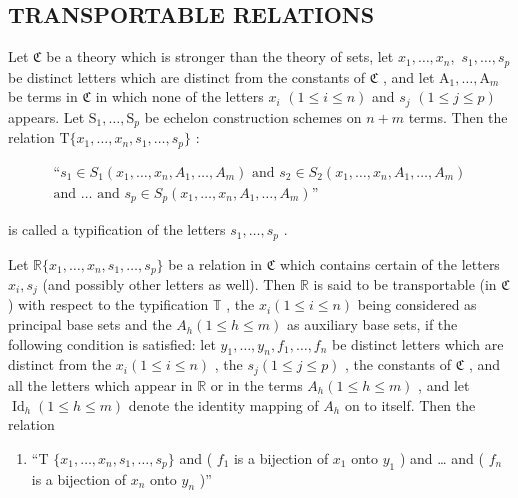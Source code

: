 \subsection{TRANSPORTABLE RELATIONS}

Let \(\mathfrak{C}\) be a theory which is stronger than the theory of sets, let \(x_{1},\ldots ,x_{n},\) \(s_1,\ldots ,s_p\) be distinct letters which are distinct from the constants of \(\mathfrak{C}\) , and let \(\mathrm{A}_1,\ldots ,\mathrm{A}_m\) be terms in \(\mathfrak{C}\) in which none of the letters \(x_{i}\) \((1\leqslant i\leqslant n)\) and \(s_j\) \((1\leqslant j\leqslant p)\) appears. Let \(\mathrm{S}_1,\ldots ,\mathrm{S}_p\) be echelon construction schemes on \(n + m\) terms. Then the relation \(\mathrm{T}\{x_1,\dots,x_n,s_1,\dots,s_p\}\) :

\[
\begin{array}{c}
\text{``}s_{1} \in S_{1}(x_{1}, \ldots, x_{n}, A_{1}, \ldots, A_{m})
\text{ and }s_{2} \in S_{2}(x_{1}, \ldots, x_{n}, A_{1}, \ldots, A_{m}) \\
\text{and }\ldots\text{ and }s_{p} \in S_{p}(x_{1}, \ldots, x_{n}, A_{1}, \ldots, A_{m})\text{''}
\end{array}
\]

is called a typification of the letters \(s_{1}, \ldots, s_{p}\) .

Let \(\mathbb{R}\{x_1, \ldots, x_n, s_1, \ldots, s_p\}\) be a relation in \(\mathfrak{C}\) which contains certain of the letters \(x_i, s_j\) (and possibly other letters as well). Then \(\mathbb{R}\) is said to be transportable (in \(\mathfrak{C}\) ) with respect to the typification \(\mathbb{T}\) , the \(x_i (1 \leqslant i \leqslant n)\) being considered as principal base sets and the \(A_h (1 \leqslant h \leqslant m)\) as auxiliary base sets, if the following condition is satisfied: let \(y_1, \ldots, y_n, f_1, \ldots, f_n\) be distinct letters which are distinct from the \(x_i (1 \leqslant i \leqslant n)\) , the \(s_j (1 \leqslant j \leqslant p)\) , the constants of \(\mathfrak{C}\) , and all the letters which appear in \(\mathbb{R}\) or in the terms \(A_h (1 \leqslant h \leqslant m)\) , and let \(\operatorname{Id}_h (1 \leqslant h \leqslant m)\) denote the identity mapping of \(A_h\) on to itself. Then the relation

\begin{enumerate}
\def\labelenumi{(\arabic{enumi})}
\tightlist
\item
  ``T \(\{x_{1},\ldots,x_{n},s_{1},\ldots,s_{p}\}\) and ( \(f_{1}\) is a bijection of \(x_{1}\) onto \(y_{1}\) ) and \ldots{} and ( \(f_{n}\) is a bijection of \(x_{n}\) onto \(y_{n}\) )''
\end{enumerate}

